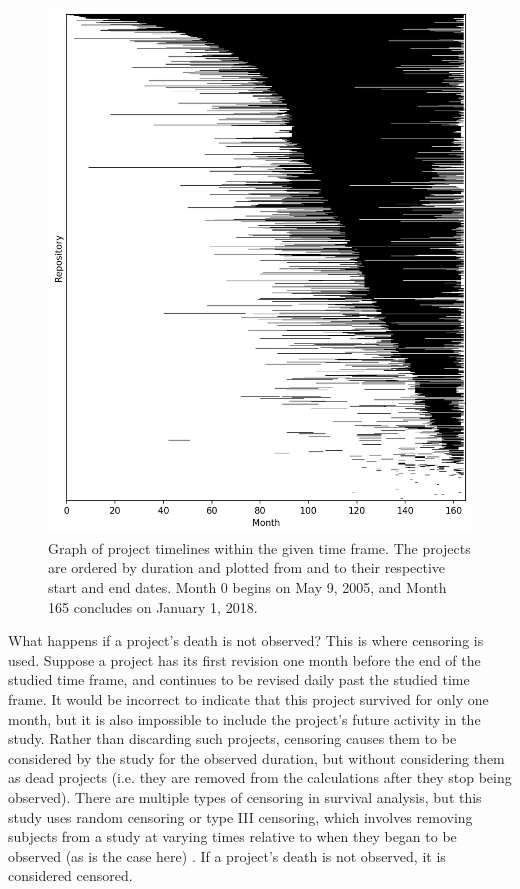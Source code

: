 \documentclass[acmconf]{acmart}
\begin{document}
\begin{figure}[ht]
\centering
\includegraphics[scale=0.4]{figure1.jpg}
\caption{Graph of project timelines within the given time frame. The projects are ordered by duration and plotted from and to their respective start and end dates. Month 0 begins on May 9, 2005, and Month 165 concludes on January 1, 2018.}
\label{fig:figure-1}
\end{figure}

What happens if a project's death is not observed?
This is where censoring is used.
Suppose a project has its first revision one month before the end of the studied time frame, and continues to be revised daily past the studied time frame.
It would be incorrect to indicate that this project survived for only one month, but it is also impossible to include the project's future activity in the study.
Rather than discarding such projects, censoring causes them to be considered by the study for the observed duration, but without considering them as dead projects (i.e. they are removed from the calculations after they stop being observed).
There are multiple types of censoring in survival analysis, but this study uses random censoring or type III censoring, which involves removing subjects from a study at varying times relative to when they began to be observed (as is the case here) \cite{renganathan2016overview}. If a project's death is not observed, it is considered censored.
\end{document}
